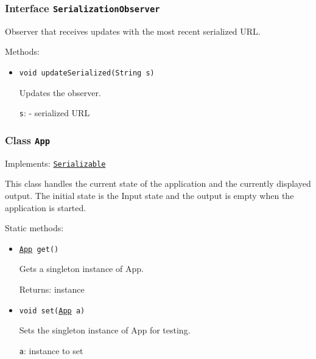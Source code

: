\subsubsection{Interface \texttt{SerializationObserver}}
\label{type:edu.kit.wavelength.client.view.SerializationObserver}
Observer that receives updates with the most recent serialized URL.

Methods:
\begin{itemize}
\item \texttt{void updateSerialized(String s)}

Updates the observer.

\texttt{s}: - serialized URL

\end{itemize}

\subsubsection{Class \texttt{App}}
\label{type:edu.kit.wavelength.client.view.App}
Implements: \texttt{\hyperref[type:edu.kit.wavelength.client.model.serialization.Serializable]{Serializable}}

This class handles the current state of the application and the currently
 displayed output. The initial state is the Input state and the output is
 empty when the application is started.

Static methods:
\begin{itemize}
\item \texttt{\hyperref[type:edu.kit.wavelength.client.view.App]{App} get()}

Gets a singleton instance of App.

Returns: instance

\item \texttt{void set(\hyperref[type:edu.kit.wavelength.client.view.App]{App} a)}

Sets the singleton instance of App for testing.

\texttt{a}: instance to set

\end{itemize}

